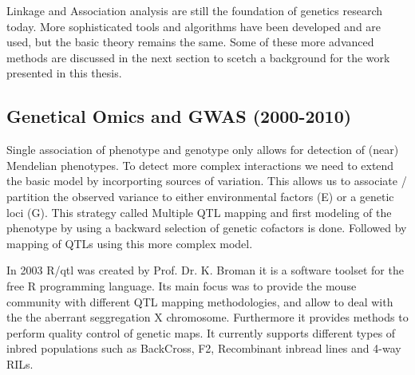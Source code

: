Linkage and Association analysis are still the foundation of genetics research today. More 
sophisticated tools and algorithms have been developed and are used, but the basic theory 
remains the same. Some of these more advanced methods are discussed in the next section to 
scetch a background for the work presented in this thesis.

\subsection{Genetical Omics and GWAS (2000-2010)}

Single association of phenotype and genotype only allows for detection of (near) Mendelian 
phenotypes. To detect more complex interactions we need to extend the basic model by incorporting 
sources of variation. This allows us to associate / partition the observed variance to either 
environmental factors (E) or a genetic loci (G). This strategy called Multiple QTL mapping and 
first modeling of the phenotype by using a backward selection of genetic cofactors is done. 
Followed by mapping of QTLs using this more complex model. \cite{Jansen:1993}

In 2003 R/qtl was created by Prof. Dr. K. Broman it is a software toolset for the free R 
programming language. Its main focus was to provide the mouse community with different QTL 
mapping methodologies, and allow to deal with the the aberrant seggregation X chromosome. 
Furthermore it provides methods to perform quality control of genetic maps. It currently 
supports different types of inbred populations such as BackCross, F2, Recombinant inbread 
lines and 4-way RILs. \cite{Broman:2003}

